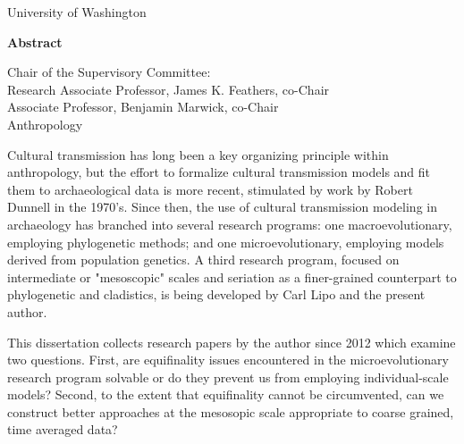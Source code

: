 \begin{titlingpage}
\begin{center}

{\large University of Washington \par}

\vskip 0.75cm

 {\large \textbf{Abstract} \par}%
 
 \vskip 0.75cm
 
    { \thesisTitle\par}
    
    \vskip 0.5cm
  
      { \thesisAuthor\par}%
      
      \vskip 0.5cm
      
      { Chair of the Supervisory Committee:\\
      Research Associate Professor, James K. Feathers, co-Chair\\
	Associate Professor, Benjamin Marwick, co-Chair\\
	Anthropology\\}
  
  \vskip 0.75cm


\end{center}
	
\DoubleSpacing
\noindent Cultural transmission has long been a key organizing principle within anthropology, but the effort to formalize cultural transmission models and fit them to archaeological data is more recent, stimulated by work by Robert Dunnell in the 1970's.  Since then, the use of cultural transmission modeling in archaeology has branched into several research programs:  one macroevolutionary, employing phylogenetic methods; and one microevolutionary, employing models derived from population genetics.  A third research program, focused on intermediate or "mesoscopic" scales and seriation as a finer-grained counterpart to phylogenetic and cladistics, is being developed by Carl Lipo and the present author.  

This dissertation collects research papers by the author since 2012 which examine two questions.  First, are equifinality issues encountered in the microevolutionary research program solvable or do they prevent us from employing individual-scale models?  Second, to the extent that equifinality cannot be circumvented, can we construct better approaches at the mesosopic scale appropriate to coarse grained, time averaged data?


\end{titlingpage}
